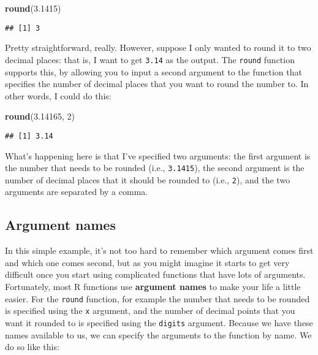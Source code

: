 \documentclass[]{book}
\newenvironment{Shaded}{\begin{snugshade}}{\end{snugshade}}
\newcommand{\DecValTok}[1]{\textcolor[rgb]{0.00,0.00,0.81}{#1}}
\newcommand{\FloatTok}[1]{\textcolor[rgb]{0.00,0.00,0.81}{#1}}
\newcommand{\KeywordTok}[1]{\textcolor[rgb]{0.13,0.29,0.53}{\textbf{#1}}}
\newcommand{\NormalTok}[1]{#1}
\begin{document}
\begin{Shaded}
\begin{Highlighting}[]
\KeywordTok{round}\NormalTok{(}\FloatTok{3.1415}\NormalTok{)}
\end{Highlighting}
\end{Shaded}

\begin{verbatim}
## [1] 3
\end{verbatim}

Pretty straightforward, really. However, suppose I only wanted to round it to two decimal places: that is, I want to get \texttt{3.14} as the output. The \texttt{round} function supports this, by allowing you to input a second argument to the function that specifies the number of decimal places that you want to round the number to. In other words, I could do this:

\begin{Shaded}
\begin{Highlighting}[]
\KeywordTok{round}\NormalTok{(}\FloatTok{3.14165}\NormalTok{, }\DecValTok{2}\NormalTok{)}
\end{Highlighting}
\end{Shaded}

\begin{verbatim}
## [1] 3.14
\end{verbatim}

What's happening here is that I've specified two arguments: the first argument is the number that needs to be rounded (i.e., \texttt{3.1415}), the second argument is the number of decimal places that it should be rounded to (i.e., \texttt{2}), and the two arguments are separated by a comma.

\hypertarget{argument-names}{%
\subsection{Argument names}\label{argument-names}}

In this simple example, it's not too hard to remember which argument comes first and which one comes second, but as you might imagine it starts to get very difficult once you start using complicated functions that have lots of arguments. Fortunately, most R functions use \textbf{argument names} to make your life a little easier. For the \texttt{round} function, for example the number that needs to be rounded is specified using the \texttt{x} argument, and the number of decimal points that you want it rounded to is specified using the \texttt{digits} argument. Because we have these names available to us, we can specify the arguments to the function by name. We do so like this:
\end{document}
